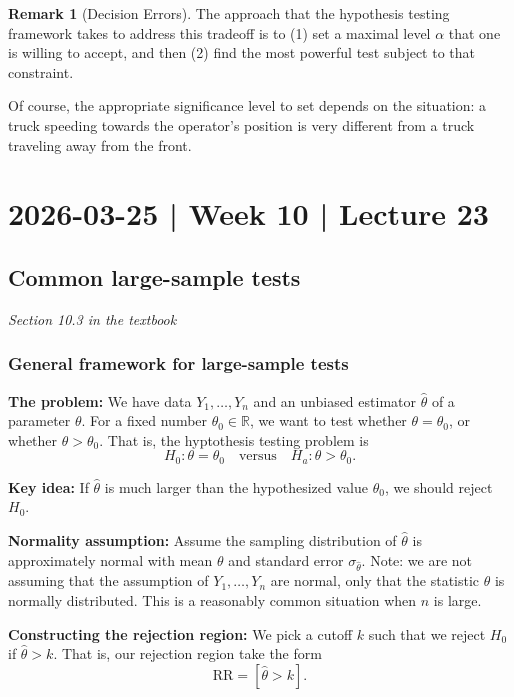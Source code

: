 \documentclass[10pt]{article}
\theoremstyle{definition}
\newtheorem{remark}[theorem]{Remark}
\newcommand{\vt}{\vskip 5mm} %
\newcommand{\Fl}{\vt\noindent\textbf} %
\newcommand{\1}[1]{\textbf{1}_{\left[#1\right]}} %
\def\R{\mathbb{R}} %
\begin{document}
\begin{remark}[Decision Errors]
  The approach that the hypothesis testing framework takes to address this
  tradeoff is to (1) set a maximal level $\alpha$ that one is willing to
  accept, and then (2) find the most powerful test subject to that constraint.

  Of course, the appropriate significance level to set depends on the
  situation: a truck speeding towards the operator's position is very
  different from a truck traveling away from the front.
\end{remark}

\newpage
\section{2026-03-25 | Week 10 | Lecture 23}
\subsection{Common large-sample tests}
\textit{Section 10.3 in the textbook}

\subsubsection{General framework for large-sample tests}
\label{sec:general-framework-for-large-sample-tests}

\Fl{The problem:} We have data $Y_{1},\ldots,Y_{n}$ and an unbiased estimator
$\widehat{\theta}$ of a parameter $\theta$. For a fixed number $\theta_{0}\in
\R$, we want to test whether
$\theta=\theta_{0}$, or whether $\theta>\theta_{0}$. That is, the hyptothesis
testing problem is
\begin{equation*}
  H_{0}: \theta=\theta_{0} \quad \text{versus} \quad H_{a}: \theta>\theta_{0}.
\end{equation*}

\Fl{Key idea:} If $\widehat{\theta}$ is much larger than the hypothesized
value $\theta_{0}$, we should reject $H_{0}$.


\Fl{Normality assumption:} Assume the sampling distribution of
$\widehat{\theta}$ is approximately normal with mean $\theta$ and standard
error $\sigma_{\widehat{\theta}}$. Note: we are not assuming that the
assumption of $Y_{1},\ldots,Y_{n}$ are normal, only that the statistic
$\widehat{\theta}$ is normally distributed. This is a reasonably common
situation when $n$ is large.


\Fl{Constructing the rejection region:} We pick a cutoff $k$ such that we
reject $H_{0}$ if $\widehat{\theta}>k$. That is, our rejection region take the
form
\begin{equation*}
  \text{RR} = \left[ \widehat{\theta}>k \right]. 
\end{equation*}
\end{document}
